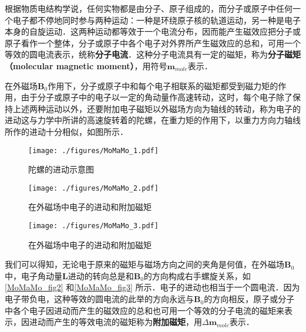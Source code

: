 
根据物质电结构学说，任何实物都是由分子、原子组成的，而分子或原子中任何一个电子都不停地同时参与两种运动：一种是环绕原子核的轨道运动，另一种是电子本身的自旋运动．这两种运动都等效于一个电流分布，因而能产生磁效应把分子或原子看作一个整体，分子或原子中各个电子对外界所产生磁效应的总和，可用一个等效的圆电流表示，统称\textbf{分子电流}．这种分子电流具有一定的磁矩，称为\textbf{分子磁矩（molecular magnetic moment）}，用符号$\mathbf m_{mole}$表示．

在外磁场$\mathbf B_0$作用下，分子或原子中和每个电子相联系的磁矩都受到磁力矩的作用，由于分子或原子中的电子以一定的角动量作高速转动，这时，每个电子除了保持上述两种运动以外，还要附加电子磁矩以外磁场方向为轴线的转动，称为电子的进动这与力学中所讲的高速旋转着的陀螺，在重力矩的作用下，以重力方向力轴线所作的进动十分相似，如图所示．
\begin{figure}[ht]
\centering
\texttt{[image: ./figures/MoMaMo\_1.pdf]}
\caption{陀螺的进动示意图} \label{MoMaMo_fig1}
\end{figure}
\begin{figure}[ht]
\centering
\texttt{[image: ./figures/MoMaMo\_2.pdf]}
\caption{在外磁场中电子的进动和附加磁矩} \label{MoMaMo_fig2}
\end{figure}
\begin{figure}[ht]
\centering
\texttt{[image: ./figures/MoMaMo\_3.pdf]}
\caption{在外磁场中电子的进动和附加磁矩} \label{MoMaMo_fig3}
\end{figure}

我们可以得知，无论电于原来的磁矩与磁场方向之间的夹角是何值，在外磁场$\mathbf B_0$中，电子角动量$\mathbf L$进动的转向总是和$\mathbf B_0$的方向构成右手螺旋关系，如\autoref{MoMaMo_fig2} 和\autoref{MoMaMo_fig3} 所示．电子的进动也相当于一个圆电流．因为电子带负电，这种等效的圆电流的此举的方向永远与$\mathbf B_0$的方向相反，原子或分子中各个电子因进动而产生的磁效应的总和也可用一个等效的分子电流的磁矩来表示，因进动而产生的等效电流的磁矩称为\textbf{附加磁矩}，用$\Delta\mathbf m_{mole}$表示．
